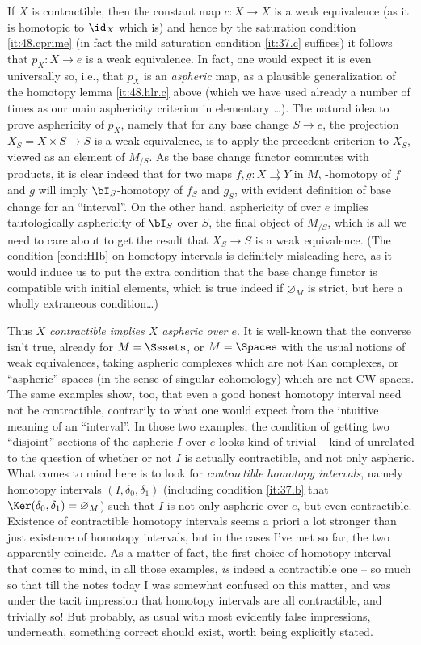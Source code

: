 If $X$ is contractible, then the constant map $c:X\to X$ is a weak
equivalence (as it is homotopic to $\id_X$ which is) and hence by the
saturation condition \ref{it:48.cprime} (in fact the mild saturation
condition \ref{it:37.c} suffices) it follows that $p_X:X\to e$ is a
weak equivalence. In fact, one would expect it is even universally so,
i.e., that $p_X$ is an \emph{aspheric} map, as a plausible
generalization of the homotopy lemma \ref{it:48.hlr.c} above (which we
have used already a number of times as our main asphericity criterion
in elementary \Ahat\ldots). The natural idea to prove asphericity of
$p_X$, namely that for any base change $S\to e$, the projection
$X_S=X\times S\to S$ is a weak equivalence, is to apply the precedent
criterion to $X_S$, viewed as an element of $M_{/S}$. As the base
change functor commutes with products, it is clear indeed that for two
maps $f,g:X\rightrightarrows Y$ in $M$, \bI-homotopy of $f$ and $g$
will imply $\bI_S$-homotopy of $f_S$ and $g_S$, with evident
definition of base change for an ``interval''. On the other hand,
asphericity of \bI{} over $e$ implies tautologically asphericity of
$\bI_S$ over $S$, the final object of $M_{/S}$, which is all we need
to care about to get the result that $X_S\to S$ is a weak
equivalence. (The condition \ref{cond:HIb} on homotopy intervals is
definitely misleading here, as it would induce us to put the extra
condition that the base change functor is compatible with initial
elements, which is true indeed if $\varnothing_M$ is strict, but here a
wholly extraneous condition\ldots)

Thus \emph{$X$ contractible implies $X$ aspheric over $e$}. It is
well-known that the converse isn't true, already for $M=\Sssets$, or
$M=\Spaces$ with the usual notions of weak equivalences, taking
aspheric complexes which are not Kan complexes, or ``aspheric'' spaces
(in the sense of singular cohomology) which are not CW-spaces. The
same examples show, too, that even a good honest homotopy interval
need not be contractible, contrarily to what one would
expect from the intuitive meaning of an ``interval''. In those two
examples, the condition of getting two ``disjoint'' sections of the
aspheric $I$ over $e$ looks kind of trivial -- kind of unrelated to
the question of whether or not $I$ is actually contractible, and not
only aspheric. What comes to mind here is to look for \emph{contractible
  homotopy intervals}, namely homotopy intervals
$(I,\delta_0,\delta_1)$ (including condition \ref{it:37.b} that
$\Ker(\delta_0,\delta_1)=\varnothing_M$) such that $I$ is not only
aspheric over $e$, but even contractible. Existence of contractible
homotopy intervals seems a priori a lot stronger than just existence
of homotopy intervals, but in the cases I've met so far, the two
apparently coincide. As a matter of fact, the first choice of homotopy
interval that comes to mind, in all those examples, \emph{is} indeed a
contractible one -- so much so that till the notes today I was
somewhat confused on this matter, and was under the tacit impression
that homotopy intervals are all contractible, and trivially so! But
probably, as usual with most evidently false impressions, underneath,
something correct should exist, worth being explicitly stated.

